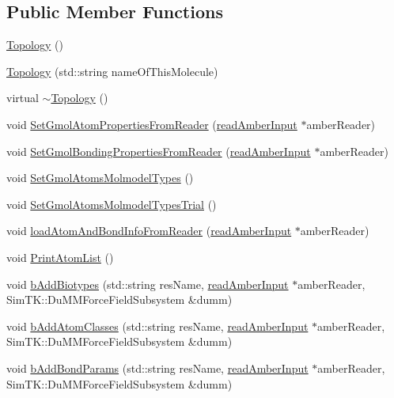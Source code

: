\subsection*{Public Member Functions}
\begin{DoxyCompactItemize}
\item 
\hyperlink{classTopology_aa3336e10118cd76ab4b4c2ebc5062a9a}{Topology} ()
\item 
\hyperlink{classTopology_a6e001dfecb9782637eb17fc907f881cb}{Topology} (std\+::string name\+Of\+This\+Molecule)
\item 
virtual \hyperlink{classTopology_a3e447669757c8311c7f6f8edc705abf2}{$\sim$\+Topology} ()
\item 
void \hyperlink{classTopology_af73c991af8591ce8adaff56bcac66494}{Set\+Gmol\+Atom\+Properties\+From\+Reader} (\hyperlink{classreadAmberInput}{read\+Amber\+Input} $\ast$amber\+Reader)
\item 
void \hyperlink{classTopology_a84be38eb9b1dd5a689588dac50085947}{Set\+Gmol\+Bonding\+Properties\+From\+Reader} (\hyperlink{classreadAmberInput}{read\+Amber\+Input} $\ast$amber\+Reader)
\item 
void \hyperlink{classTopology_a84ca6201376207b20f1a6bc006f76bc8}{Set\+Gmol\+Atoms\+Molmodel\+Types} ()
\item 
void \hyperlink{classTopology_a0f0fa7fb6323767bb6db03fb1b74058c}{Set\+Gmol\+Atoms\+Molmodel\+Types\+Trial} ()
\item 
void \hyperlink{classTopology_a2127fe5e3df9f24bee960d15d4001ac4}{load\+Atom\+And\+Bond\+Info\+From\+Reader} (\hyperlink{classreadAmberInput}{read\+Amber\+Input} $\ast$amber\+Reader)
\item 
void \hyperlink{classTopology_a7083e732de18012caa11f9e5ea68c071}{Print\+Atom\+List} ()
\item 
void \hyperlink{classTopology_a6cd69af97ef2cadbfc66b12791821494}{b\+Add\+Biotypes} (std\+::string res\+Name, \hyperlink{classreadAmberInput}{read\+Amber\+Input} $\ast$amber\+Reader, Sim\+T\+K\+::\+Du\+M\+M\+Force\+Field\+Subsystem \&dumm)
\item 
void \hyperlink{classTopology_a4c6e17966e730dbc7972b1d060ae32aa}{b\+Add\+Atom\+Classes} (std\+::string res\+Name, \hyperlink{classreadAmberInput}{read\+Amber\+Input} $\ast$amber\+Reader, Sim\+T\+K\+::\+Du\+M\+M\+Force\+Field\+Subsystem \&dumm)
\item 
void \hyperlink{classTopology_adfe0053006ef2dfca18377d2c3726e3b}{b\+Add\+Bond\+Params} (std\+::string res\+Name, \hyperlink{classreadAmberInput}{read\+Amber\+Input} $\ast$amber\+Reader, Sim\+T\+K\+::\+Du\+M\+M\+Force\+Field\+Subsystem \&dumm)

\end{DoxyCompactItemize}
